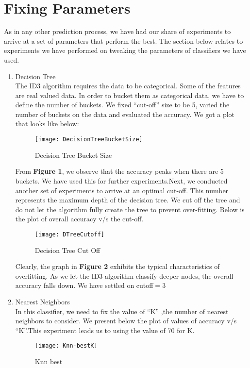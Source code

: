\documentclass{article}
\begin{document}
\section{Fixing Parameters}

As in any other prediction process, we have had our share of experiments to arrive at a set of parameters that perform the best. The section below relates to experiments we have performed on tweaking the parameters of classifiers we have used.

\begin{enumerate}
\item Decision Tree\\
The ID3 algorithm requires the data to be categorical. Some of the features are real valued data. In order to bucket them as categorical data, we have to define the number of buckets. We fixed “cut-off” size to be 5, varied the number of buckets on the data and evaluated the accuracy. We got a plot that looks like below:

\begin{figure}[h]
      \centering
    \texttt{[image: DecisionTreeBucketSize]}
    \caption{Decision Tree Bucket Size}
\end{figure}



From \textbf{Figure 1}, we observe that the accuracy peaks when there are 5 buckets. We have used this for further experiments.Next, we conducted another set of experiments to arrive at an optimal cut-off. This number represents the maximum depth of the decision tree. We cut off the tree and do not let the algorithm fully create the tree to prevent over-fitting. Below is the plot of overall accuracy v/s the cut-off.
\begin{figure}[h]
      \centering
    \texttt{[image: DTreeCutoff]}
    \caption{Decision Tree Cut Off}
\end{figure}
Clearly, the graph in \textbf{Figure 2} exhibits the typical characteristics of overfitting. As we let the ID3 algorithm classify deeper nodes, the overall accuracy falls down. We have settled on cutoff$=$3


\item Nearest Neighbors\\
In this classifier, we need to fix the value of “K” ,the number of nearest neighbors to consider. We present below the plot of values of accuracy v/s “K”.This experiment leads us to using the value of 70 for K.
\begin{figure}[h]
    \centering
    \texttt{[image: Knn-bestK]}
    \caption{Knn best}
\end{figure}


\end{enumerate}
\end{document}
